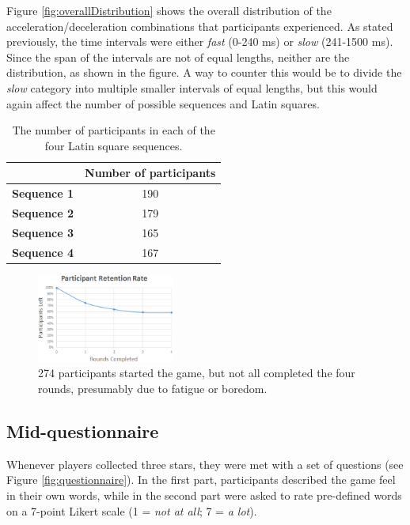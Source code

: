 Figure \ref{fig:overallDistribution} shows the overall distribution of the acceleration/deceleration combinations that participants experienced. As stated previously, the time intervals were either \textit{fast} (0-240 ms) or \textit{slow} (241-1500 ms). Since the span of the intervals are not of equal lengths, neither are the distribution, as shown in the figure. A way to counter this would be to divide the \textit{slow} category into multiple smaller intervals of equal lengths, but this would again affect the number of possible sequences and Latin squares.

\begin{table} \centering
\caption{The number of participants in each of the four Latin square sequences.}
\label{table:latinSequenceNumber}
\begin{tabular}{cc}
\toprule
& \textbf{Number of participants}\\
\midrule
\textbf{Sequence 1} & 190\\
\textbf{Sequence 2} & 179\\
\textbf{Sequence 3} & 165\\
\textbf{Sequence 4} & 167\\
\bottomrule
\end{tabular}
\end{table}

\begin{figure}[htbp]
\centering
\includegraphics[width=0.4\textwidth]{Pics/retetionRate}
\caption{274 participants started the game, but not all completed the four rounds, presumably due to fatigue or boredom.}
\label{fig:retention}
\end{figure}

\subsection{Mid-questionnaire}
Whenever players collected three stars, they were met with a set of questions (see Figure \ref{fig:questionnaire}). In the first part, participants described the game feel in their own words, while in the second part were asked to rate pre-defined words on a 7-point Likert scale (1 = \textit{not at all}; 7 = \textit{a lot}).

